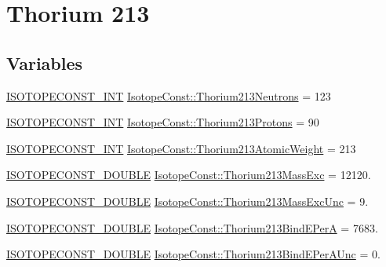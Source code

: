 \hypertarget{group___isotope_const-_thorium-_th213}{}\section{Thorium 213}
\label{group___isotope_const-_thorium-_th213}
\subsection*{Variables}
\begin{DoxyCompactItemize}
\item 
\mbox{\hyperlink{group___isotope_const-_macros_ga5f18360b3e99483a35c32d789e62621c}{I\+S\+O\+T\+O\+P\+E\+C\+O\+N\+S\+T\+\_\+\+I\+NT}} \mbox{\hyperlink{group___isotope_const-_thorium-_th213_gae3f2e5d4a015077c38a4fce2730cadbd}{Isotope\+Const\+::\+Thorium213\+Neutrons}} = 123
\item 
\mbox{\hyperlink{group___isotope_const-_macros_ga5f18360b3e99483a35c32d789e62621c}{I\+S\+O\+T\+O\+P\+E\+C\+O\+N\+S\+T\+\_\+\+I\+NT}} \mbox{\hyperlink{group___isotope_const-_thorium-_th213_ga44aef30a8b810b7bf5c1b1e6ae47ae73}{Isotope\+Const\+::\+Thorium213\+Protons}} = 90
\item 
\mbox{\hyperlink{group___isotope_const-_macros_ga5f18360b3e99483a35c32d789e62621c}{I\+S\+O\+T\+O\+P\+E\+C\+O\+N\+S\+T\+\_\+\+I\+NT}} \mbox{\hyperlink{group___isotope_const-_thorium-_th213_ga19166a19101c25d1cf33da73f1acfa7d}{Isotope\+Const\+::\+Thorium213\+Atomic\+Weight}} = 213
\item 
\mbox{\hyperlink{group___isotope_const-_macros_ga8f45a7272ce02c0b4c65c44636ed719a}{I\+S\+O\+T\+O\+P\+E\+C\+O\+N\+S\+T\+\_\+\+D\+O\+U\+B\+LE}} \mbox{\hyperlink{group___isotope_const-_thorium-_th213_ga90638a54fe1fe2c54276c138c6b7afc3}{Isotope\+Const\+::\+Thorium213\+Mass\+Exc}} = 12120.
\item 
\mbox{\hyperlink{group___isotope_const-_macros_ga8f45a7272ce02c0b4c65c44636ed719a}{I\+S\+O\+T\+O\+P\+E\+C\+O\+N\+S\+T\+\_\+\+D\+O\+U\+B\+LE}} \mbox{\hyperlink{group___isotope_const-_thorium-_th213_ga61ae7e0486e131d114437c3d967380f4}{Isotope\+Const\+::\+Thorium213\+Mass\+Exc\+Unc}} = 9.
\item 
\mbox{\hyperlink{group___isotope_const-_macros_ga8f45a7272ce02c0b4c65c44636ed719a}{I\+S\+O\+T\+O\+P\+E\+C\+O\+N\+S\+T\+\_\+\+D\+O\+U\+B\+LE}} \mbox{\hyperlink{group___isotope_const-_thorium-_th213_gaeaa1aa1d7cdd4f8bfcfdc75231313203}{Isotope\+Const\+::\+Thorium213\+Bind\+E\+PerA}} = 7683.
\item 
\mbox{\hyperlink{group___isotope_const-_macros_ga8f45a7272ce02c0b4c65c44636ed719a}{I\+S\+O\+T\+O\+P\+E\+C\+O\+N\+S\+T\+\_\+\+D\+O\+U\+B\+LE}} \mbox{\hyperlink{group___isotope_const-_thorium-_th213_ga477fe510fdc2708ddc607a046253e51b}{Isotope\+Const\+::\+Thorium213\+Bind\+E\+Per\+A\+Unc}} = 0.

\end{DoxyCompactItemize}
